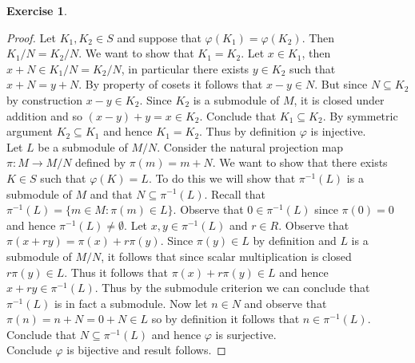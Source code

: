 \documentclass[8pt]{amsart}
\theoremstyle{plain}%
\theoremstyle{definition}
\newtheorem*{exercise}{Exercise}%
\theoremstyle{remark}
\numberwithin{equation}{section}
\begin{document}
\begin{exercise}
\begin{enumerate}
\begin{proof}
				Let $K_1, K_2 \in S$ and suppose that $\varphi(K_1) = \varphi(K_2)$. Then $K_1/N = K_2/N$. We want to show that $K_1 = K_2$. Let $x \in K_1$, then $x + N \in K_1/N = K_2/N$, in particular there exists $y \in K_2$ such that $x + N = y + N$. By property of cosets it follows that $x - y \in N$. But since $N \subseteq K_2$ by construction $x - y \in K_2$. Since $K_2$ is a submodule of $M$, it is closed under addition and so $(x - y) + y = x \in K_2$. Conclude that $K_1 \subseteq K_2$. By symmetric argument $K_2 \subseteq K_1$ and hence $K_1 = K_2$. Thus by definition $\varphi$ is injective.\\

				Let $L$ be a submodule of $M/N$. Consider the natural projection map $\pi : M \to M/N$ defined by $\pi(m) = m + N$. We want to show that there exists $K \in S$ such that $\varphi(K) = L$. To do this we will show that $\pi^{-1}(L)$ is a submodule of $M$ and that $N \subseteq \pi^{-1}(L)$. Recall that $\pi^{-1}(L) = \{m \in M : \pi(m) \in L\}$. Observe that $0 \in \pi^{-1}(L)$ since $\pi(0) = 0$ and hence $\pi^{-1}(L) \neq \emptyset$. Let $x, y \in \pi^{-1}(L)$ and $r \in R$. Observe that $\pi(x + ry) = \pi(x) + r \pi(y)$. Since $\pi(y) \in L$ by definition and $L$ is a submodule of $M/N$, it follows that since scalar multiplication is closed $r\pi(y) \in L$. Thus it follows that $\pi(x) + r \pi(y) \in L$ and hence $x + ry \in \pi^{-1}(L)$. Thus by the submodule criterion we can conclude that $\pi^{-1}(L)$ is in fact a submodule. Now let $n \in N$ and observe that $\pi(n) = n + N = 0 + N \in L$ so by definition it follows that $n \in \pi^{-1}(L)$. Conclude that $N \subseteq \pi^{-1}(L)$ and hence $\varphi$ is surjective.\\

				Conclude $\varphi$ is bijective and result follows.
			\end{proof}
	\end{enumerate}
\end{exercise}
\end{document}
